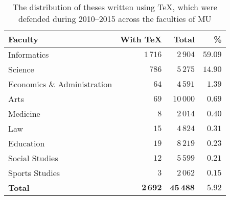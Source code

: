 \documentclass{csbulletin}
\begin{document}
{  \begin{table}
    \begin{tabularx}{\textwidth}{Xrrr}
      \textbf{Faculty} & \textbf{With \TeX} & \textbf{Total} &
      \textbf{\%} \\
      \toprule
      Informatics                 & $1\,716$ & $2\,904$  &
      $59.09$ \\%
      Science                     & $786$     & $5\,275$  &
      $14.90$ \\%
      Economics \& Administration & $64$      & $4\,591$  &
      $1.39$  \\%
      Arts                        & $69$      & $10\,000$ &
      $0.69$  \\%
      Medicine                    & $8$       & $2\,014$  &
      $0.40$  \\%
      Law                         & $15$      & $4\,824$  &
      $0.31$  \\%
      Education                   & $19$      & $8\,219$  &
      $0.23$  \\%
      Social Studies              & $12$      & $5\,599$  &
      $0.21$  \\%
      Sports Studies              & $3$       & $2\,062$  &
      $0.15$  \\%
      \bottomrule
      \textbf{Total} & $\mathbf{2\,692}$ & $\mathbf{45\,488}$ &
      $\mathbf{5.92}$
    \end{tabularx}
    \caption{The distribution of theses written using \TeX,
      which were defended during 2010--2015 across the faculties of
      MU}
    \label{table:statistics-tex}
  \end{table}

}
\end{document}

